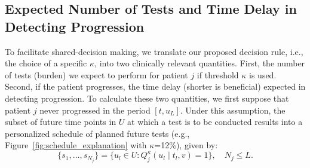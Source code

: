 \subsection{Expected Number of Tests and Time Delay in Detecting Progression}
\label{subsec:exp_delay_estimation}
To facilitate shared-decision making, we translate our proposed decision rule, i.e., the choice of a specific $\kappa$, into two clinically relevant quantities. First, the number of tests (burden) we expect to perform for patient $j$ if threshold $\kappa$ is used. Second, if the patient progresses, the time delay (shorter is beneficial) expected in detecting progression. To calculate these two quantities, we first suppose that patient $j$ never progressed in the period $[t, u_L]$. Under this assumption, the subset of future time points in $U$ at which a test is to be conducted results into a personalized schedule of planned future tests (e.g., Figure~\ref{fig:schedule_explanation} with $\kappa$=12\%), given by:
\begin{equation}
\label{eq:personalized_schedule_grid}
\{s_1, \ldots, s_{N_j}\} = \big\{ u_l \in U : Q_j^\kappa(u_l \mid t_l, v) = 1 \big\}, \quad N_j \leq L.
\end{equation}
